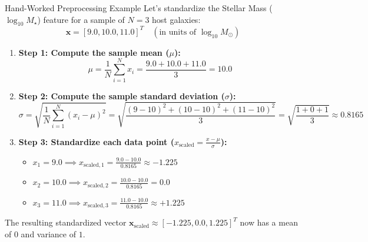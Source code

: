 \documentclass[9pt]{beamer}
\begin{document}
\begin{frame}{Hand-Worked Preprocessing Example}
  Let's standardize the Stellar Mass ($\log_{10} M_\star$) feature for a sample of $N=3$ host galaxies:
  $$\mathbf{x} = [9.0, 10.0, 11.0]^T \quad (\text{in units of } \log_{10} M_\odot)$$
  \begin{enumerate}
    \item \textbf{Step 1: Compute the sample mean ($\mu$):}
      $$\mu = \frac{1}{N} \sum_{i=1}^N x_i = \frac{9.0 + 10.0 + 11.0}{3} = 10.0$$
    \item \textbf{Step 2: Compute the sample standard deviation ($\sigma$):}
      $$\sigma = \sqrt{\frac{1}{N} \sum_{i=1}^N (x_i - \mu)^2} = \sqrt{\frac{(9-10)^2 + (10-10)^2 + (11-10)^2}{3}} = \sqrt{\frac{1 + 0 + 1}{3}} \approx 0.8165$$
    \item \textbf{Step 3: Standardize each data point ($x_{\text{scaled}} = \frac{x - \mu}{\sigma}$):}
      \begin{itemize}
        \item $x_1 = 9.0 \implies x_{\text{scaled}, 1} = \frac{9.0 - 10.0}{0.8165} \approx -1.225$
        \item $x_2 = 10.0 \implies x_{\text{scaled}, 2} = \frac{10.0 - 10.0}{0.8165} = 0.0$
        \item $x_3 = 11.0 \implies x_{\text{scaled}, 3} = \frac{11.0 - 10.0}{0.8165} \approx +1.225$
      \end{itemize}
  \end{enumerate}
  The resulting standardized vector $\mathbf{x}_{\text{scaled}} \approx [-1.225, 0.0, 1.225]^T$ now has a mean of $0$ and variance of $1$.
\end{frame}
\end{document}
